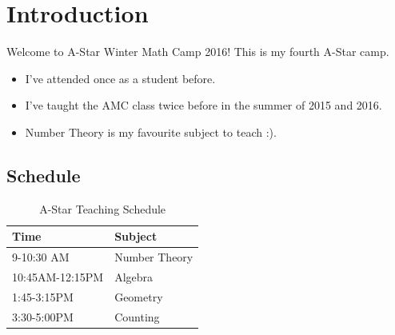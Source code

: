 \small\tableofcontents %

\clearpage


\section{Introduction}

Welcome to A-Star Winter Math Camp 2016!  This is my fourth A-Star camp.  
\begin{itemize}
	\item  I've attended once as a student before.
	\item  I've taught the AMC class twice before in the summer of 2015 and 2016.
	\item Number Theory is my favourite subject to teach :).   
\end{itemize}


\clearpage


\subsection{Schedule}

\begin{table}[h]
	\centering
	\begin{tabular}{l l}
		\toprule
		\textbf{Time} & \textbf{Subject} \\
		\midrule
		9-10:30 AM & Number Theory \\
		10:45AM-12:15PM & Algebra \\ 
		1:45-3:15PM & Geometry \\
		3:30-5:00PM & Counting \\
		\bottomrule
	\end{tabular}
	\caption{A-Star Teaching Schedule}
\end{table}

